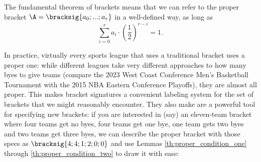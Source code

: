 {

The fundamental theorem of brackets means that we can refer to the proper bracket $\A = \bracksig{a_0; ...; a_r}$ in a well-defined way, as long as $$\sum_{i=0}^r a_i \cdot \left(\frac{1}{2}\right)^{r - i} = 1.$$

In practice, virtually every sports league that uses a traditional bracket uses a proper one: while different leagues take very different approaches to how many byes to give teams (compare the 2023 West Coast Conference Men's Basketball Tournament with the 2015 NBA Eastern Conference Playoffs), they are almost all proper. This makes bracket signatures a convenient labeling system for the set of brackets that we might reasonably encounter. They also make are a powerful tool for specifying new brackets: if you are interested in (say) an eleven-team bracket where four teams get no byes, four teams get one bye, one team gets two byes and two teams get three byes, we can describe the proper bracket with those specs as $\bracksig{4; 4; 1; 2; 0; 0}$ and use Lemmas \ref{th:proper_condition_one} through \ref{th:proper_condition_two} to draw it with ease:

}